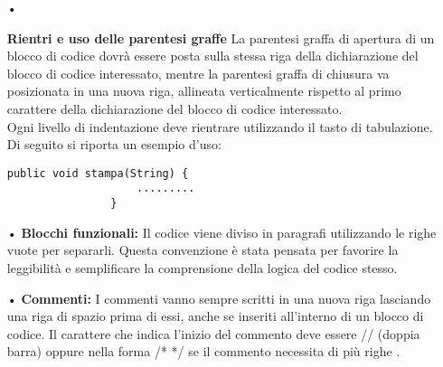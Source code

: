 {{{\begin{itemize}
			    \item[•] { \textbf{Rientri e uso delle parentesi graffe} La
			    parentesi graffa di apertura di un blocco di codice dovrà essere
			    posta sulla stessa riga della dichiarazione del blocco di codice
			    interessato, mentre la parentesi graffa di chiusura va posizionata
			    in una nuova riga, allineata verticalmente rispetto al primo
			    carattere della dichiarazione del blocco di codice interessato.\\
				Ogni livello di indentazione deve rientrare utilizzando il tasto di
				tabulazione. Di seguito si riporta un esempio d’uso:
					\begin{lstlisting}[basicstyle=\ttfamily]
				public void stampa(String) {
				    .........
				}
				\end{lstlisting}
				}
				
				\item[•] { \textbf{Blocchi funzionali:} Il codice viene diviso in
				paragrafi utilizzando le righe vuote per separarli. Questa
				convenzione è stata pensata per favorire la leggibilità e
				semplificare la comprensione della logica del codice stesso.
				}				
				
				\item[•] { \textbf{Commenti:} I commenti vanno sempre scritti in una
				nuova riga lasciando una riga di spazio prima di essi, anche se
				inseriti all’interno di un blocco di codice. Il carattere che indica
				l’inizio del commento deve essere // (doppia barra) oppure nella
				forma /* */ se il commento necessita di più righe .
				}
			\end{itemize}
			
		}
		
		
}}

